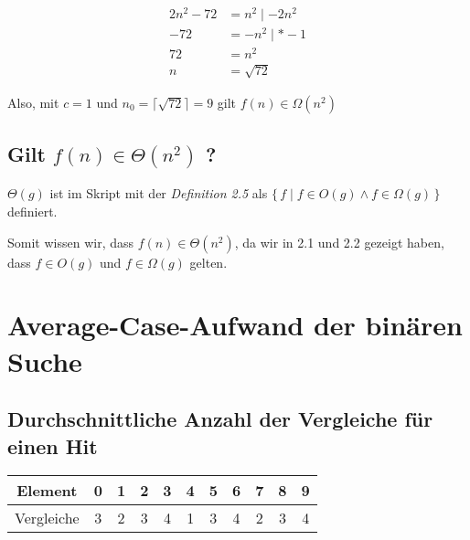 \documentclass{article}
\begin{document}
\begin{align*}
	2n^2 - 72 & = n^2 \mid - 2n^2 \\
	- 72      & = -n^2 \mid * -1  \\
	72        & = n^2             \\
	n         & = \sqrt{72}
\end{align*}

\vspace{1em}

\begin{flushleft}
	Also, mit $c = 1$ und $n_0 = \lceil\sqrt{72}\rceil = 9$ gilt $f(n) \in \Omega(n^2)$
\end{flushleft}

\subsection{Gilt $f(n) \in \Theta(n^2)$ ?}

\begin{flushleft}
	$\Theta(g)$ ist im Skript mit der \emph{Definition 2.5} als $\{ \, f \mid f \in O(g) \wedge f \in \Omega(g) \, \}$ definiert.

	\hspace{0.5em}

	Somit wissen wir, dass $f(n) \in \Theta(n^2)$, da wir in 2.1 und 2.2 gezeigt haben, dass $f \in O(g)$ und $f \in \Omega(g)$ gelten.
\end{flushleft}

\section{Average-Case-Aufwand der binären Suche}

\subsection{Durchschnittliche Anzahl der Vergleiche für einen Hit}

\vspace{1em}

\begin{center}
	\begin{tabular}{|c|c|c|c|c|c|c|c|c|c|c|}
		\hline
		Element    & 0 & 1 & 2 & 3 & 4 & 5 & 6 & 7 & 8 & 9 \\
		\hline
		Vergleiche & 3 & 2 & 3 & 4 & 1 & 3 & 4 & 2 & 3 & 4 \\
		\hline
	\end{tabular}
\end{center}
\end{document}
